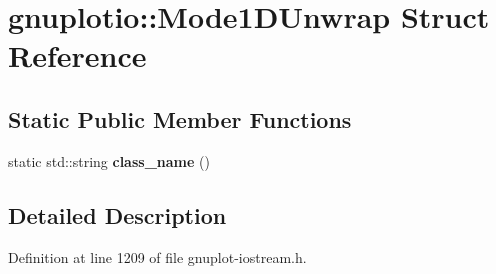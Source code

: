 \hypertarget{structgnuplotio_1_1_mode1_d_unwrap}{}\section{gnuplotio\+:\+:Mode1\+D\+Unwrap Struct Reference}
\label{structgnuplotio_1_1_mode1_d_unwrap}
\subsection*{Static Public Member Functions}
\begin{DoxyCompactItemize}
\item 
static std\+::string {\bfseries class\+\_\+name} ()\hypertarget{structgnuplotio_1_1_mode1_d_unwrap_a2350096ad4d8b668f6df56c32cab69b6}{}\label{structgnuplotio_1_1_mode1_d_unwrap_a2350096ad4d8b668f6df56c32cab69b6}

\end{DoxyCompactItemize}


\subsection{Detailed Description}


Definition at line 1209 of file gnuplot-\/iostream.\+h.

